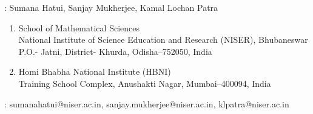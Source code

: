 \documentclass[12pt,a4paper]{article}
\begin{document}
: Sumana Hatui, Sanjay Mukherjee, Kamal Lochan Patra

\begin{enumerate}
\item[1)] School of Mathematical Sciences\\
National Institute of Science Education and Research (NISER), Bhubaneswar\\
P.O.- Jatni, District- Khurda, Odisha--752050, India

\item[2)] Homi Bhabha National Institute (HBNI)\\
Training School Complex, Anushakti Nagar, Mumbai--400094, India
\end{enumerate}

: sumanahatui@niser.ac.in, sanjay.mukherjee@niser.ac.in, klpatra@niser.ac.in
\end{document}
